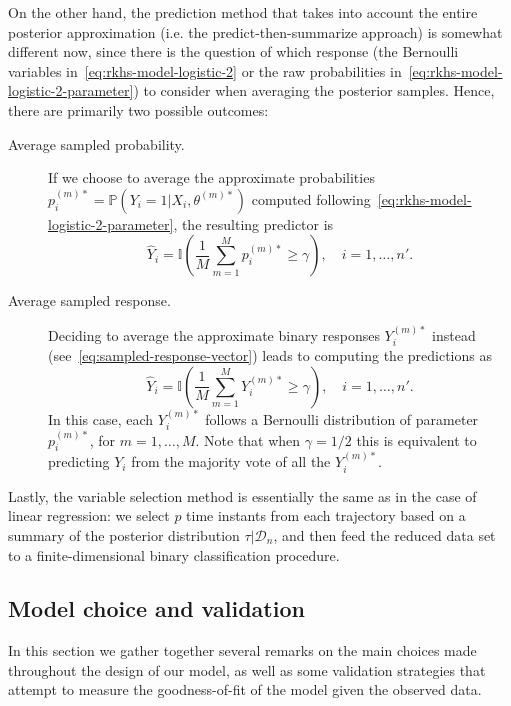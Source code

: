 On the other hand, the prediction method that takes into account the entire posterior approximation (i.e. the predict-then-summarize approach) is somewhat different now, since there is the question of which response (the Bernoulli variables in~\eqref{eq:rkhs-model-logistic-2} or the raw probabilities in~\eqref{eq:rkhs-model-logistic-2-parameter}) to consider when averaging the posterior samples. Hence, there are primarily two possible outcomes:
\begin{description}
  \item[Average sampled probability.] If we choose to average the approximate probabilities \(p_i^{(m)*} = \mathbb P(Y_i =1 | X_i,\theta^{(m)*})\) computed following~\eqref{eq:rkhs-model-logistic-2-parameter}, the resulting predictor is
  \[
    \hat Y_i = \mathbb I\left(\frac{1}{M} \sum_{m=1}^M p_i^{(m)*} \geq \gamma\right), \quad i=1,\dots,n'.
  \]
  \item[Average sampled response.] Deciding to average the approximate binary responses \(Y_i^{(m)*}\) instead (see~\eqref{eq:sampled-response-vector}) leads to computing the predictions as
\[
  \hat Y_i = \mathbb I\left(\frac{1}{M} \sum_{m=1}^M Y_i^{(m)*} \geq \gamma\right), \quad i=1,\dots,n'.
\]
In this case, each \(Y_i^{(m)*}\) follows a Bernoulli distribution of parameter \(p_i^{(m)*}\), for \(m=1,\dots,M\). Note that when \(\gamma=1/2\) this is equivalent to predicting \(Y_i\) from the majority vote of all the \(Y_i^{(m)*}\).
\end{description}

Lastly, the variable selection method is essentially the same as in the case of linear regression: we select \(p\) time instants from each trajectory based on a summary of the posterior distribution \(\tau | \mathcal D_n\), and then feed the reduced data set to a finite-dimensional binary classification procedure.

\subsection{Model choice and validation}\label{sec:model-choice}

In this section we gather together several remarks on the main choices made throughout the design of our model, as well as some validation strategies that attempt to measure the goodness-of-fit of the model given the observed data.

